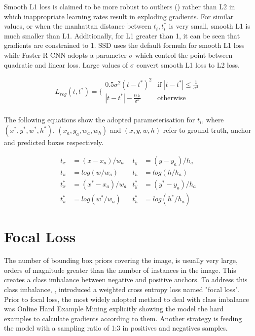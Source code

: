 Smooth L1 loss is claimed to be more robust to outliers (\cite{ren2015faster}) rather than L2 in which inappropriate learning rates result in exploding gradients. For similar values, or when the manhattan distance between $t_i, t_i^*$ is very small, smooth L1 is much smaller than L1. Additionally, for L1 greater than 1, it can be seen that gradients are constrained to 1. SSD uses the default formula for smooth L1 loss while Faster R-CNN adopts a parameter $\sigma$ which control the point between quadratic and linear loss. Large values of $\sigma$ convert smooth L1 loss to L2 loss.

\begin{equation}
    L_{reg}(t,t^*)= \bigg\{
    \begin{array}{ll}
      0.5\sigma^2(t-t^*)^2 & \text{if } |t-t^*|\leq \frac{1}{\sigma^2} \\
      |t-t^*|-\frac{0.5}{\sigma^2} &  \text{otherwise} \\
    \end{array}
\end{equation}

The following equations show the adopted parameterisation for $t_i$, where $(x^*,y^*,w^*,h^*)$, $(x_a,y_a,w_a,w_h)$ and $(x,y,w,h)$ refer to ground truth, anchor and predicted boxes respectively. 

\begin{align}
t_x		&= (x-x_a)/w_a			&		t_y	&= (y-y_a)/h_a \\
t_w		&= log(w/w_a)			&		t_h 	&= log(h/h_a) \\
t_x^*		&= (x^*-x_a)/w_a		&		t_y^*	&= (y^*-y_a)/h_a \\
t_w^*	&= log(w^*/w_a)		&		t_h^*	&= log(h^*/h_a) 
\end{align}

\section{Focal Loss}
The number of bounding box priors covering the image, is usually very large, orders of magnitude greater than the number of instances in the image. This creates a class imbalance between negative and positive anchors. To address this class imbalance, \cite{lin2017focal}, introduced a weighted cross entropy loss named "focal loss". Prior to focal loss, the most widely adopted method to deal with class imbalance was Online Hard Example Mining explicitly showing the model the hard examples to calculate gradients according to them. Another strategy is feeding the model with a sampling ratio of 1:3 in positives and negatives samples.

